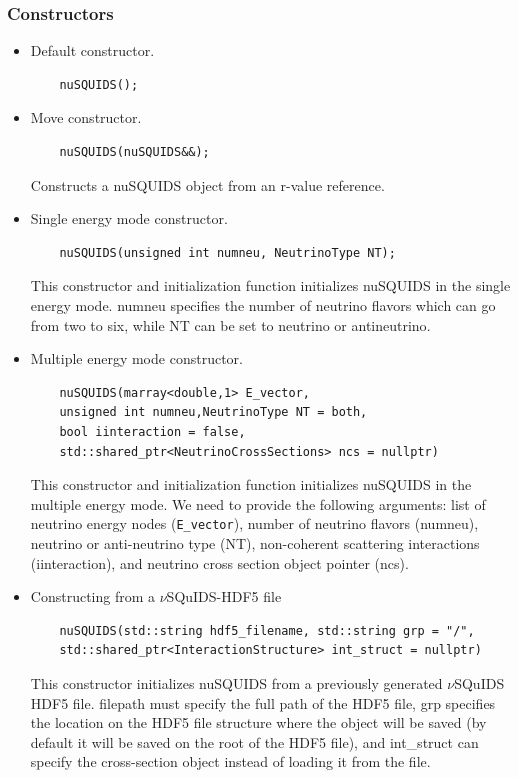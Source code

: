 \documentclass[3p,12pt]{elsarticle}
\newcommand{\ttf}{\ttfamily}
\begin{document}
\subsubsection{Constructors}

\begin{itemize}
\item Default constructor.
  \begin{lstlisting}
    nuSQUIDS();
  \end{lstlisting}
\item Move constructor.
  \begin{lstlisting}
    nuSQUIDS(nuSQUIDS&&);
  \end{lstlisting}
Constructs a {\ttf nuSQUIDS} object from an r-value reference.  
\item Single energy mode constructor.
  \begin{lstlisting}
    nuSQUIDS(unsigned int numneu, NeutrinoType NT);
  \end{lstlisting}
This constructor and initialization function initializes {\ttfamily nuSQUIDS} in the
single energy mode. {\ttfamily numneu} specifies the number of
neutrino flavors which can go from two to six, while {\ttfamily NT} can be
set to  {\ttfamily neutrino} or {\ttfamily antineutrino}. 
\item Multiple energy mode constructor.
  \begin{lstlisting}
    nuSQUIDS(marray<double,1> E_vector,
    unsigned int numneu,NeutrinoType NT = both,
    bool iinteraction = false,
    std::shared_ptr<NeutrinoCrossSections> ncs = nullptr)
  \end{lstlisting}
This constructor and initialization function initializes {\ttfamily nuSQUIDS} in the
multiple energy mode. We need to provide the following arguments:
list of neutrino energy nodes
(\lstinline[columns=fixed,breaklines=true]{E_vector}),
number of neutrino flavors ({\ttf numneu}), neutrino or
anti-neutrino type ({\ttf NT}),  non-coherent scattering
interactions ({\ttf iinteraction}), and neutrino cross section object
pointer ({\ttf ncs}).  

\item Constructing from a $\nu$SQuIDS-HDF5 file
  \begin{lstlisting}
    nuSQUIDS(std::string hdf5_filename, std::string grp = "/",
    std::shared_ptr<InteractionStructure> int_struct = nullptr)
  \end{lstlisting}
This constructor initializes {\ttfamily nuSQUIDS} from a 
previously generated $\nu$SQuIDS HDF5 file. {\ttfamily filepath} must
specify the full path of the HDF5 file, {\ttfamily grp} specifies the
location on the HDF5 file structure where the object will be saved (by default
it will be saved on the {\ttfamily root} of the HDF5 file), and {\ttf
  int\_struct} can specify the cross-section object instead of loading it from
the file.
\end{itemize}
\end{document}
